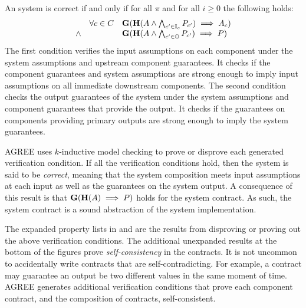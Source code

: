 An system is correct if and only if for all $\pi$ and for all $i \ge 0$ the following holds:
\[
\begin{array}{lll}
        & \forall c \in C &  
            \mathbf{G}(\mathbf{H}(A \wedge 
            \bigwedge_{c^\prime \in \mathbb{I}_{c}} P_{c^\prime}) 
            \implies A_{c}) \\
 \wedge &   & 
            \mathbf{G}(\mathbf{H}(A \wedge 
            \bigwedge_{c^\prime \in \mathbb{O}} P_{c^\prime}) 
            \implies P)
\end{array}
\]
The first condition verifies the input assumptions on each component under the system assumptions and upstream component guarantees. 
It checks if the component guarantees and system assumptions are strong enough to imply input assumptions on all immediate downstream components.
The second condition checks the output guarantees of the system under the system assumptions and component guarantees that provide the output. 
It checks if the guarantees on components providing primary outputs are strong enough to imply the system guarantees.

AGREE uses $k$-inductive model checking to prove or disprove each generated verification condition.
If all the verification conditions hold, then the system is said to be \emph{correct}, meaning that the system composition meets input assumptions at each input as well as the guarantees on the system output. A consequence of this result is that $\mathbf{G}(\mathbf{H}(A) \implies P)$ holds for the system contract. As such, the system contract is a sound abstraction of the system implementation.

The expanded property lists in  and  are the results from disproving or proving out the above verification conditions.
The additional unexpanded results at the bottom of the figures prove \emph{self-consistency} in the contracts.
It is not uncommon to accidentally write contracts that are self-contradicting.
For example, a contract may guarantee an output be two different values in the same moment of time.
AGREE generates additional verification conditions that prove each component contract, and the composition of contracts, self-consistent.
